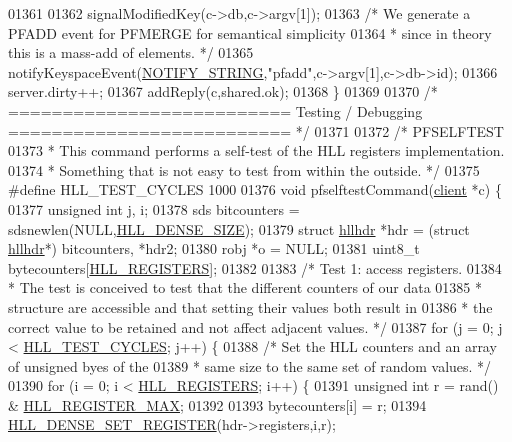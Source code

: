 \begin{DoxyCode}
{{01361 
01362     signalModifiedKey(c->db,c->argv[1]);
01363     \textcolor{comment}{/* We generate a PFADD event for PFMERGE for semantical simplicity}
01364 \textcolor{comment}{     * since in theory this is a mass-add of elements. */}
01365     notifyKeyspaceEvent(\hyperlink{server_8h_a1902292b73b71baa65d86db2d61b47ce}{NOTIFY\_STRING},\textcolor{stringliteral}{"pfadd"},c->argv[1],c->db->id);
01366     server.dirty++;
01367     addReply(c,shared.ok);
01368 \}
01369 
01370 \textcolor{comment}{/* ========================== Testing / Debugging  ========================== */}
01371 
01372 \textcolor{comment}{/* PFSELFTEST}
01373 \textcolor{comment}{ * This command performs a self-test of the HLL registers implementation.}
01374 \textcolor{comment}{ * Something that is not easy to test from within the outside. */}
01375 \textcolor{preprocessor}{#}\textcolor{preprocessor}{define} \textcolor{preprocessor}{HLL\_TEST\_CYCLES} 1000
01376 \textcolor{keywordtype}{void} pfselftestCommand(\hyperlink{structclient}{client} *c) \{
01377     \textcolor{keywordtype}{unsigned} \textcolor{keywordtype}{int} j, i;
01378     sds bitcounters = sdsnewlen(NULL,\hyperlink{hyperloglog_8c_ad677821a745c7306ef02ccca0ff6f92f}{HLL\_DENSE\_SIZE});
01379     \textcolor{keyword}{struct} \hyperlink{structhllhdr}{hllhdr} *hdr = (\textcolor{keyword}{struct} \hyperlink{structhllhdr}{hllhdr}*) bitcounters, *hdr2;
01380     robj *o = NULL;
01381     uint8\_t bytecounters[\hyperlink{hyperloglog_8c_aa053beb90136828dcb46545c7445fc36}{HLL\_REGISTERS}];
01382 
01383     \textcolor{comment}{/* Test 1: access registers.}
01384 \textcolor{comment}{     * The test is conceived to test that the different counters of our data}
01385 \textcolor{comment}{     * structure are accessible and that setting their values both result in}
01386 \textcolor{comment}{     * the correct value to be retained and not affect adjacent values. */}
01387     \textcolor{keywordflow}{for} (j = 0; j < \hyperlink{hyperloglog_8c_a5739eae82e6d3a654a6af38974511bd2}{HLL\_TEST\_CYCLES}; j++) \{
01388         \textcolor{comment}{/* Set the HLL counters and an array of unsigned byes of the}
01389 \textcolor{comment}{         * same size to the same set of random values. */}
01390         \textcolor{keywordflow}{for} (i = 0; i < \hyperlink{hyperloglog_8c_aa053beb90136828dcb46545c7445fc36}{HLL\_REGISTERS}; i++) \{
01391             \textcolor{keywordtype}{unsigned} \textcolor{keywordtype}{int} r = rand() & \hyperlink{hyperloglog_8c_af33bbd0f0613975a8821000c92febd31}{HLL\_REGISTER\_MAX};
01392 
01393             bytecounters[i] = r;
01394             \hyperlink{hyperloglog_8c_a57f99ca1675593d83a5b1fc014b3945a}{HLL\_DENSE\_SET\_REGISTER}(hdr->registers,i,r);
}}
\end{DoxyCode}
